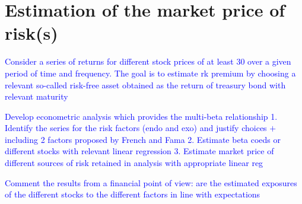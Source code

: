 \documentclass[hidelinks,11pts]{article}
\DeclareMathOperator{\1}{\mathbbm{1}}
\begin{document}
\section{Estimation of the market price of risk(s)}


\textcolor{blue}{Consider a series of returns for different stock prices of at least 30 over a given period of time and frequency. The goal is to estimate  rk premium by choosing a relevant so-called  risk-free asset obtained as the return of treasury bond with relevant maturity}

\textcolor{blue}{Develop econometric analysis which provides the multi-beta relationship 1. Identify the series for the risk factors (endo and exo) and justify choices $+$ including 2 factors proposed by French and Fama 2. Estimate beta coeds or different stocks with relevant linear regression 3. Estimate market price of different sources of risk retained in analysis with appropriate linear reg}

\textcolor{blue}{Comment the results from a financial point of view: are the estimated exposures of the different stocks to the different factors in line with expectations}


\end{document}
